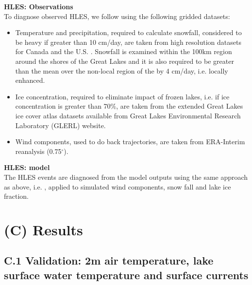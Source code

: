 \documentclass[a0b,landscape]{a0poster}
\begin{document}
\begin{multicols*}{4}
\vspace{0.5cm}
\noindent
\textbf{HLES: Observations}\\
To diagnose observed HLES, we follow \citet{notaro2015} using the following gridded datasets:
    \begin{itemize}
        \footnotesize
        \item Temperature and precipitation, required to calculate snowfall, considered
              to be heavy if greater than 10 cm/day, are taken from high resolution datasets
              for Canada  \citep[10km, ][]{hopkinson2011} and the U.S. \citep[0.125$^\circ$, ][]{maurer2002}.
              Snowfall is examined within the 100km region around the shores of the Great Lakes and it is also
              required to be greater than the mean over the non-local region of the  by 4 cm/day, i.e. locally enhanced.
        \item Ice concentration, required to eliminate impact of frozen lakes, i.e. if ice
              concentration is greater than 70\%, are taken from the extended Great Lakes ice
              cover atlas datasets available from Great Lakes Environmental Research
              Laboratory (GLERL) website.
        \item Wind components, used to do back trajectories, are taken from ERA-Interim reanalysis (0.75$^\circ$).
    \end{itemize}

\noindent
\textbf{HLES: model}\\
The HLES events are diagnosed from the model outputs using the same approach as above, i.e. \citet{notaro2015}, applied to simulated wind components, snow fall and lake ice fraction.


\section*{(C) Results}
\subsection*{C.1 Validation: 2m air temperature, lake surface water temperature and surface currents}


\end{multicols*}
\end{document}
